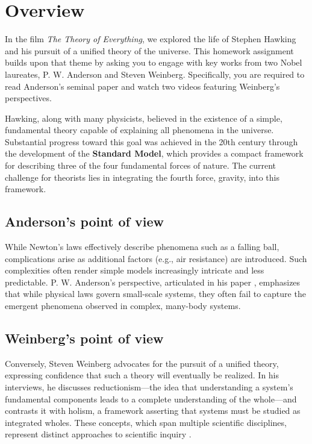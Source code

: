 \documentclass[a4paper,12pt]{article}
\begin{document}
\section*{Overview}

\indent In the film \textit{The Theory of Everything}, we explored the life of Stephen Hawking and his pursuit of a unified theory of the universe. This homework assignment builds upon that theme by asking you to engage with key works from two Nobel laureates, P. W. Anderson and Steven Weinberg. Specifically, you are required to read Anderson's seminal paper \cite{doi:10.1126/science.177.4047.393} and watch two videos \cite{Weinberg2021, Weinberg2021Part2} featuring Weinberg's perspectives.

Hawking, along with many physicists, believed in the existence of a simple, fundamental theory capable of explaining all phenomena in the universe. Substantial progress toward this goal was achieved in the 20th century through the development of the \textbf{Standard Model}, which provides a compact framework for describing three of the four fundamental forces of nature. The current challenge for theorists lies in integrating the fourth force, gravity, into this framework.
\subsection*{Anderson's point of view}
While Newton’s laws effectively describe phenomena such as a falling ball, complications arise as additional factors (e.g., air resistance) are introduced. Such complexities often render simple models increasingly intricate and less predictable. P. W. Anderson’s perspective, articulated in his paper \cite{doi:10.1126/science.177.4047.393}, emphasizes that while physical laws govern small-scale systems, they often fail to capture the emergent phenomena observed in complex, many-body systems.
\subsection*{Weinberg's point of view}
Conversely, Steven Weinberg advocates for the pursuit of a unified theory, expressing confidence that such a theory will eventually be realized. In his interviews, he discusses reductionism—the idea that understanding a system’s fundamental components leads to a complete understanding of the whole—and contrasts it with holism, a framework asserting that systems must be studied as integrated wholes. These concepts, which span multiple scientific disciplines, represent distinct approaches to scientific inquiry \cite{WikipediaReductionism, WikipediaHolism}.
\end{document}
